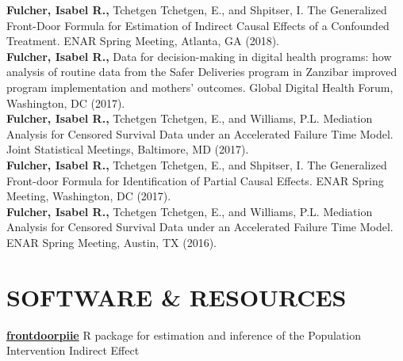 \documentclass[12pt]{article}
\begin{document}
\textbf{Fulcher, Isabel R.,} Tchetgen Tchetgen, E., and Shpitser, I. The Generalized Front-Door Formula for Estimation of Indirect Causal Effects of a Confounded Treatment. ENAR Spring Meeting, Atlanta, GA (2018). \\

\textbf{Fulcher, Isabel R.,} Data for decision-making in digital health programs: how analysis of routine data from the Safer Deliveries program in Zanzibar improved program implementation and mothers' outcomes. Global Digital Health Forum, Washington, DC (2017). \\

\textbf{Fulcher, Isabel R.,} Tchetgen Tchetgen, E., and Williams, P.L. Mediation Analysis for Censored Survival Data under an Accelerated Failure Time Model. Joint Statistical Meetings, Baltimore, MD (2017). \\

\textbf{Fulcher, Isabel R.,} Tchetgen Tchetgen, E., and Shpitser, I. The Generalized Front-door Formula for Identification of Partial Causal Effects. ENAR Spring Meeting, Washington, DC (2017). \\

\textbf{Fulcher, Isabel R.,} Tchetgen Tchetgen, E., and Williams, P.L. Mediation Analysis for Censored Survival Data under an Accelerated Failure Time Model. ENAR Spring Meeting, Austin, TX (2016). 

\section*{\textbf{{\large S}{OFTWARE}  {\large \&} {\large R}{ESOURCES} }}

{\bf \href{https://isabelfulcher.github.io/frontdoorpiie/}{frontdoorpiie}} R package for estimation and inference of the Population Intervention Indirect Effect \\

\end{document}
